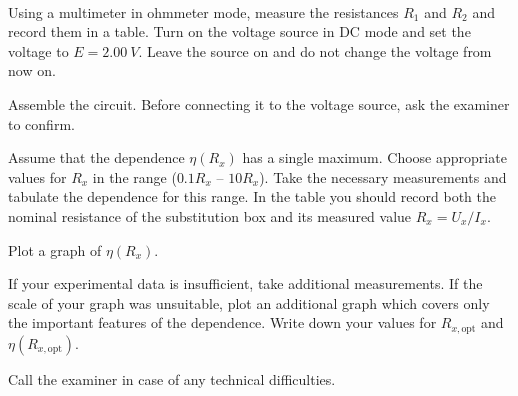 \documentclass[../TST.tex]{subfiles}
\begin{document}
\begin{eproblem}{\ \\[5pt]}
\begin{subpart}
	\item Using a multimeter in ohmmeter mode, measure the resistances $R_1$ and $R_2$ and record them in a table. Turn on the voltage source in DC mode and set the voltage to $E=\qty{2.00}{V}$. Leave the source on and do not change the voltage from now on.  
	\item Assemble the circuit. Before connecting it to the voltage source, ask the examiner to confirm. 
	\item Assume that the dependence $\eta(R_x)$ has a single maximum. Choose appropriate values for $R_x$ in the range ($0.1R_x$ -- $10R_x$). Take the necessary measurements and tabulate the dependence for this range. In the table you should record both the nominal resistance of the substitution box and its measured value $R_x=U_x/I_x$. 
	\item Plot a graph of $\eta(R_x)$. 
	\item If your experimental data is insufficient, take additional measurements. If the scale of your graph was unsuitable, plot an additional graph which covers only the important features of the dependence. Write down your values for $R_{x,\mathrm{opt}}$ and $\eta(R_{x,\mathrm{opt}})$. 
\end{subpart}
Call the examiner in case of any technical difficulties.\\
\end{eproblem}
\end{document}
